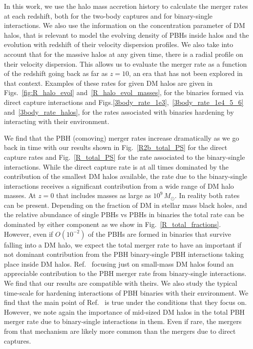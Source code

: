 \documentclass[aps, prd, reprint, nofootinbib]{revtex4-2}
\begin{document}
In this work, we use the halo mass accretion history to calculate the merger rates at each redshift, both for the two-body captures and for binary-single interactions. 
We also use the information on the concentration parameter of DM halos, 
that is relevant to model the evolving density of PBHs inside halos and the evolution with redshift of their velocity dispersion profiles. 
We also take into account that for the massive halos at any given time, there is a radial profile on their velocity dispersion. 
This allows us to evaluate the merger rate as a function of the redshift going back as far as $z=10$, an era that has not been explored in that context. 
Examples of these rates for given DM halos are given in Figs.~\ref{fig:R_halo_evol} and~\ref{R_halo_evol_masses}, for the binaries formed via direct capture interactions and Figs.\ref{3body_rate_1e3},~\ref{3body_rate_1e4_5_6} and~\ref{3body_rate_halos}, for the rates associated with binaries hardening by interacting with their environment.

We find that the PBH (comoving) merger rates increase dramatically as we go back in time with our results shown in Fig.~\ref{R2b_total_PS} for the direct capture rates and Fig.~\ref{R_total_PS} for the rate associated to the binary-single interactions.
While the direct capture rate is at all times dominated by the contribution of the smallest DM halos available, the rate due to the binary-single interactions receives a significant contribution from a wide range of DM halo masses. 
At $z=0$ that includes masses as large as $10^{9} \, M_{\odot}$.  
In reality both rates can be present. Depending on the fraction of DM in stellar mass black holes, and the relative abundance of single PBHs vs PBHs in binaries the total rate can be dominated by either component as we show in Fig.~\ref{R_total_fractions}.  
However, even if $O(10^{-2})$ of the PBHs are formed in binaries that survive falling into a DM halo, we expect the total merger rate to have an important if not dominant contribution from the PBH binary-single PBH interactions taking place inside DM halos.
Ref.~\cite{Kritos} focusing just on small-mass DM halos found an appreciable contribution to the PBH merger rate from binary-single interactions. We find that our results are compatible with theirs.
We also study the typical time-scale for hardening interactions of PBH binaries with their environment. We find that the main point of Ref.~\cite{early_PBH_1} is true under the conditions that they focus on. However, we note again the importance of mid-sized DM halos in the total PBH merger rate due to binary-single interactions in them. Even if rare, the mergers from that mechanism are likely more common than the mergers due to direct captures.
\end{document}
